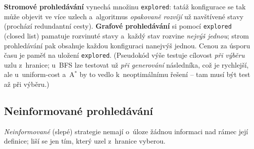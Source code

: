 \noindent\textbf{Stromové prohledávání} vynechá množinu \texttt{explored}: tatáž konfigurace se tak může objevit ve více uzlech a~algoritmus \emph{opakovaně rozvíjí} už navštívené stavy (prochází redundantní cesty). \textbf{Grafové prohledávání} si pomocí \texttt{explored} (closed list) pamatuje rozvinuté stavy a~každý stav rozvine \emph{nejvýš jednou}; strom prohledávání pak obsahuje každou konfiguraci nanejvýš jednou. Cenou za úsporu času je paměť na uložení \texttt{explored}. (Pseudokód výše testuje cílovost \emph{při výběru} uzlu z~hranice; u~BFS lze testovat už \emph{při generování} následníka, což je rychlejší, ale u~uniform-cost a~A${}^\ast$ by to vedlo k~neoptimálnímu řešení -- tam musí být test až při výběru.)

\begin{center}
\end{center}

\subsection{Neinformované prohledávání}

\emph{Neinformované} (slepé) strategie nemají o~úloze žádnou informaci nad rámec její definice; liší se jen tím, který uzel z~hranice vyberou.

